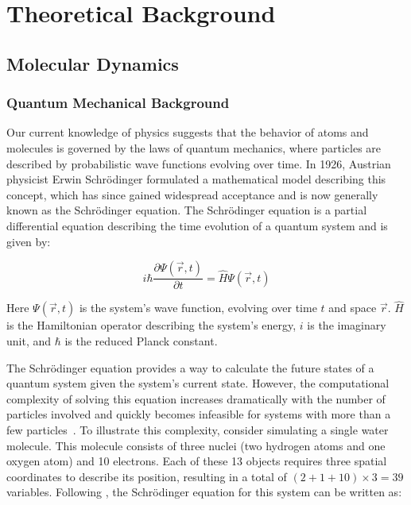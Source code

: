 \chapter{Theoretical Background}
\label{sec:theoretical_background}


\section{Molecular Dynamics}

\subsection{Quantum Mechanical Background}

Our current knowledge of physics suggests that the behavior of atoms and molecules is governed by the laws of quantum mechanics, where particles are described by probabilistic wave functions evolving over time. In 1926, Austrian physicist Erwin Schrödinger formulated a mathematical model describing this concept, which has since gained widespread acceptance and is now generally known as the Schrödinger equation. The Schrödinger equation is a partial differential equation describing the time evolution of a quantum system and is given by:

\begin{equation}
      i \hbar \frac{\partial \Psi(\vec{r}, t)}{\partial t} = \hat{H} \Psi(\vec{r}, t)
\end{equation}

Here $\Psi(\vec{r}, t)$ is the system's wave function, evolving over time $t$ and space $\vec{r}$. $\hat{H}$ is the Hamiltonian operator describing the system's energy, $i$ is the imaginary unit, and $\hbar$ is the reduced Planck constant.
\smallskip

The Schrödinger equation provides a way to calculate the future states of a quantum system given the system's current state. However, the computational complexity of solving this equation increases dramatically with the number of particles involved and quickly becomes infeasible for systems with more than a few particles~\cite{Leimkuhler2015}. To illustrate this complexity, consider simulating a single water molecule. This molecule consists of three nuclei (two hydrogen atoms and one oxygen atom) and 10 electrons. Each of these 13 objects requires three spatial coordinates to describe its position, resulting in a total of $(2+1+10) \times 3 = 39$ variables. Following \cite{Leimkuhler2015}, the Schrödinger equation for this system can be written as:


